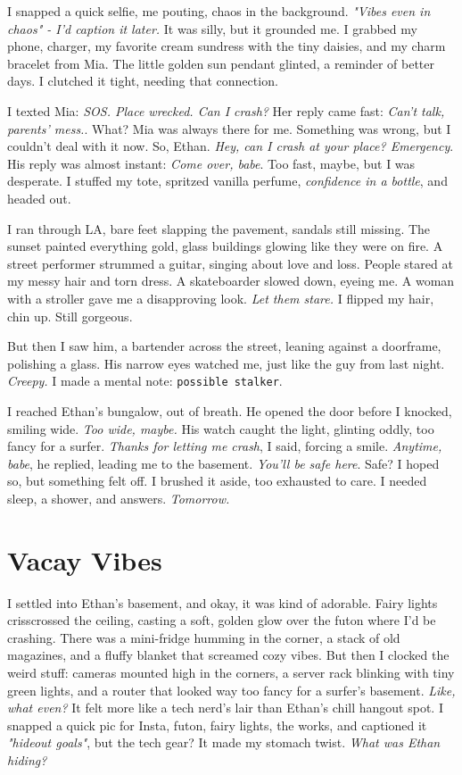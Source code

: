 \documentclass[12pt,oneside]{book}
\newcommand{\note}[1]{\texttt{#1}}
\begin{document}
I snapped a quick selfie, me pouting, chaos in the background. \textit{"Vibes even in chaos" - I’d caption it later.} It was silly, but it grounded me. I grabbed my phone, charger, my favorite cream sundress with the tiny daisies, and my charm bracelet from Mia. The little golden sun pendant glinted, a reminder of better days. I clutched it tight, needing that connection.

I texted Mia: \textit{SOS. Place wrecked. Can I crash?} Her reply came fast: \textit{Can’t talk, parents’ mess.}. What? Mia was always there for me. Something was wrong, but I couldn’t deal with it now. So, Ethan. \textit{Hey, can I crash at your place? Emergency}. His reply was almost instant: \textit{Come over, babe}. Too fast, maybe, but I was desperate. I stuffed my tote, spritzed vanilla perfume, \textit{confidence in a bottle}, and headed out.

I ran through LA, bare feet slapping the pavement, sandals still missing. The sunset painted everything gold, glass buildings glowing like they were on fire. A street performer strummed a guitar, singing about love and loss. People stared at my messy hair and torn dress. A skateboarder slowed down, eyeing me. A woman with a stroller gave me a disapproving look. \textit{Let them stare.} I flipped my hair, chin up. Still gorgeous.

But then I saw him, a bartender across the street, leaning against a doorframe, polishing a glass. His narrow eyes watched me, just like the guy from last night. \textit{Creepy.} I made a mental note: \note{possible stalker}.

I reached Ethan’s bungalow, out of breath. He opened the door before I knocked, smiling wide. \textit{Too wide, maybe.} His watch caught the light, glinting oddly, too fancy for a surfer. \textit{Thanks for letting me crash}, I said, forcing a smile. \textit{Anytime, babe}, he replied, leading me to the basement. \textit{You’ll be safe here}. Safe? I hoped so, but something felt off. I brushed it aside, too exhausted to care. I needed sleep, a shower, and answers. \textit{Tomorrow.}

\chapter{Vacay Vibes}

I settled into Ethan’s basement, and okay, it was kind of adorable. Fairy lights crisscrossed the ceiling, casting a soft, golden glow over the futon where I’d be crashing. There was a mini-fridge humming in the corner, a stack of old magazines, and a fluffy blanket that screamed cozy vibes. But then I clocked the weird stuff: cameras mounted high in the corners, a server rack blinking with tiny green lights, and a router that looked way too fancy for a surfer’s basement. \textit{Like, what even?} It felt more like a tech nerd’s lair than Ethan’s chill hangout spot. I snapped a quick pic for Insta, futon, fairy lights, the works, and captioned it \textit{"hideout goals"}, but the tech gear? It made my stomach twist. \textit{What was Ethan hiding?}
\end{document}
